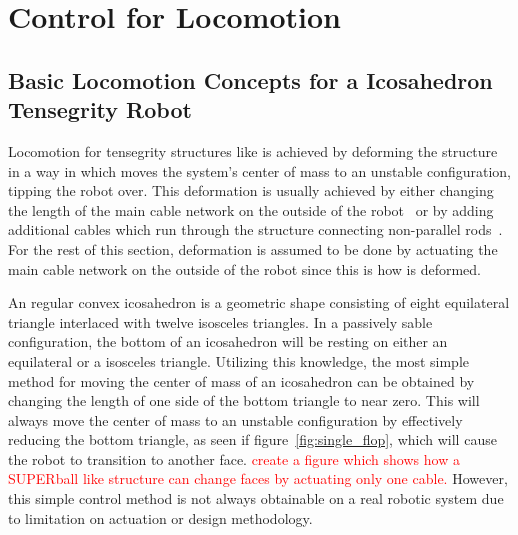 \chapter{Control for \SB{} Locomotion}
\label{controls}

\section{Basic Locomotion Concepts for a Icosahedron Tensegrity Robot}
\label{basic_locomotion}

Locomotion for tensegrity structures like \SB{} is achieved by deforming the structure in a way in which moves the system's center of mass to an unstable configuration, tipping the robot over.
This deformation is usually achieved by either changing the length of the main cable network on the outside of the robot~\cite{sabelhaus2015system,kim2014rapid} or by adding additional cables which run through the structure connecting non-parallel rods~\cite{caluwaerts2014design}.
For the rest of this section, deformation is assumed to be done by actuating the main cable network on the outside of the robot since this is how \SB{} is deformed.

An regular convex icosahedron is a geometric shape consisting of eight equilateral triangle interlaced with twelve isosceles triangles.
In a passively sable configuration, the bottom of an icosahedron will be resting on either an equilateral or a isosceles triangle.
Utilizing this knowledge, the most simple method for moving the center of mass of an icosahedron can be obtained by changing the length of one side of the bottom triangle to near zero.
This will always move the center of mass to an unstable configuration by effectively reducing the bottom triangle, as seen if figure~\ref{fig:single_flop}, which will cause the robot to transition to another face.
\textcolor{red}{create a figure which shows how a SUPERball like structure can change faces by actuating only one cable.}
However, this simple control method is not always obtainable on a real robotic system due to limitation on actuation or design methodology.

